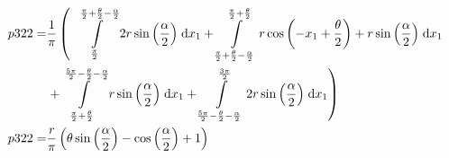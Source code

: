 \begin{align}
    p322 =&\frac{1}{\pi} \left(\;\;\int\limits_{\frac{\pi}{2}}^{\frac{\pi}{2} + \frac{\theta}{2} - \frac{\alpha}{2}}2 r \sin{\left (\frac{\alpha}{2} \right )}\;\mathrm{d}x_{1}+\int\limits_{\frac{\pi}{2} + \frac{\theta}{2} - \frac{\alpha}{2}}^{\frac{\pi}{2} + \frac{\theta}{2}}r \cos{\left (- x_{1} + \frac{\theta}{2} \right )} + r \sin{\left (\frac{\alpha}{2} \right )}\;\mathrm{d}x_{1}\right.\notag\\
 &\left.+\int\limits_{\frac{\pi}{2} + \frac{\theta}{2}}^{\frac{5 \pi}{2} - \frac{\theta}{2} - \frac{\alpha}{2}}r \sin{\left (\frac{\alpha}{2} \right )}\;\mathrm{d}x_{1}+\int\limits_{\frac{5 \pi}{2} - \frac{\theta}{2} - \frac{\alpha}{2}}^{\frac{3 \pi}{2}}2 r \sin{\left (\frac{\alpha}{2} \right )}\;\mathrm{d}x_{1}\right)\label{p322Def}\\
    p322 =& \frac{r}{\pi} \left(\theta \sin{\left (\frac{\alpha}{2} \right )} - \cos{\left (\frac{\alpha}{2} \right )} + 1\right)\label{p322Sln}
\end{align}